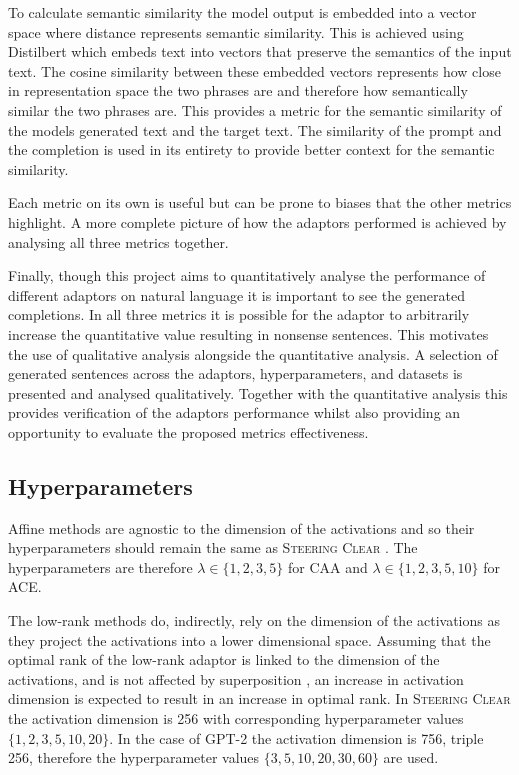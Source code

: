 To calculate semantic similarity the model output is embedded into a vector space where distance represents semantic similarity.
This is achieved using Distilbert \citep{distilbert} which embeds text into vectors that preserve the semantics of the input text.
The cosine similarity between these embedded vectors represents how close in representation space the two phrases are and therefore how semantically similar the two phrases are.
This provides a metric for the semantic similarity of the models generated text and the target text.
The similarity of the prompt and the completion is used in its entirety to provide better context for the semantic similarity.

Each metric on its own is useful but can be prone to biases that the other metrics highlight.
A more complete picture of how the adaptors performed is achieved by analysing all three metrics together.

Finally, though this project aims to quantitatively analyse the performance of different adaptors on natural language it is important to see the generated completions.
In all three metrics it is possible for the adaptor to arbitrarily increase the quantitative value resulting in nonsense sentences.
This motivates the use of qualitative analysis alongside the quantitative analysis.
A selection of generated sentences across the adaptors, hyperparameters, and datasets is presented and analysed qualitatively.
Together with the quantitative analysis this provides verification of the adaptors performance whilst also providing an opportunity to evaluate the proposed metrics effectiveness.

\subsection{Hyperparameters}

Affine methods are agnostic to the dimension of the activations and so their hyperparameters should remain the same as {\scshape Steering Clear} .
The hyperparameters are therefore $\lambda \in \{1, 2, 3, 5\}$ for CAA and $\lambda \in \{1, 2, 3, 5, 10\}$ for ACE.

The low-rank methods do, indirectly, rely on the dimension of the activations as they project the activations into a lower dimensional space.
Assuming that the optimal rank of the low-rank adaptor is linked to the dimension of the activations, and is not affected by superposition , an increase in activation dimension is expected to result in an increase in optimal rank.
In {\scshape Steering Clear} the activation dimension is 256 with corresponding hyperparameter values $\{1, 2, 3, 5, 10, 20\}$.
In the case of GPT-2 \cite{gpt-2} the activation dimension is 756, triple 256, therefore the hyperparameter values $\{3, 5, 10, 20, 30, 60\}$ are used.

